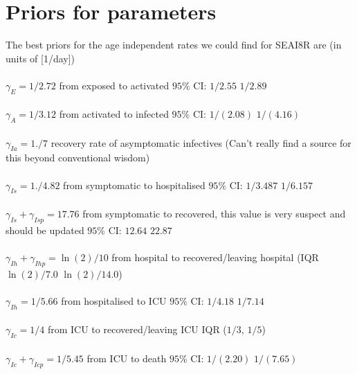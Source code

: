 \documentclass[10pt]{article}
\begin{document}
\section{Priors for parameters}
The best priors for the age independent rates we could find for SEAI8R are (in units of [1/day])\\
\\
$\gamma_{E}=1/2.72$   from exposed to activated $95\%$ CI:  $1/2.55$ $1/2.89$\\
\\
$\gamma_{A}= 1/3.12$   from activated to infected $95\%$ CI: $1/(2.08)$ $1/(4.16)$\\
\\
$\gamma_{Ia}= 1./7$           recovery rate of asymptomatic infectives (Can't really find a source for this beyond conventional wisdom)\\
\\
$\gamma_{Is}   = 1./4.82$  from symptomatic to hospitalised $95\%$ CI: $1/3.487$  $1/6.157$\\
\\
$\gamma_{Is}+\gamma_{Isp}=17.76$ from symptomatic to recovered, this value is very suspect and should be updated $95\%$ CI: $12.64$ $22.87$\\
\\
$\gamma_{Ih}+\gamma_{Ihp}= \ln(2)/10$ from hospital to recovered/leaving hospital (IQR $\ln(2)/7.0$ $\ln(2)/14.0$)\\
\\
$\gamma_{Ih} = 1/5.66$  from hospitalised to ICU $95\%$ CI: $1/4.18$ $1/7.14$\\
\\
$\gamma_{Ic} = 1/4  $ from ICU to recovered/leaving ICU IQR ($1/3$, $1/5$)\\
\\
$\gamma_{Ic} +\gamma_{Icp}  = 1/5.45$  from ICU to death $95\%$  CI:  $1/(2.20)$ $1/(7.65)$\\
\end{document}
